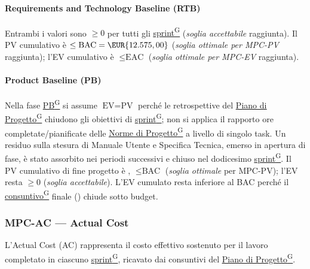 \documentclass[a4paper,12pt]{article}
\providecommand{\glslink}[2]{\href{https://alittlebyte-19.github.io/Documentazione/glossario.html\#gls-#1}{\underline{#2}\textsuperscript{\scriptsize G}}}
\begin{document}
\paragraph*{Requirements and Technology Baseline (RTB)} Entrambi i valori sono $\geq 0$ per tutti gli \glslink{sprint}{sprint} (\emph{soglia accettabile} raggiunta). Il PV cumulativo è $\leq \text{BAC} = \EUR{12.575,00}$ (\emph{soglia ottimale per MPC-PV} raggiunta); l'EV cumulativo è $\leq \text{EAC}$ (\emph{soglia ottimale per MPC-EV} raggiunta).

\paragraph*{Product Baseline (PB)} Nella fase \glslink{pb-product-baseline}{PB} si assume $\text{EV} = \text{PV}$ perché le retrospettive del \glslink{piano-di-progetto}{Piano di Progetto} chiudono gli obiettivi di \glslink{sprint}{sprint}; non si applica il rapporto ore completate/pianificate delle \glslink{norme-di-progetto}{Norme di Progetto} a livello di singolo task. Un residuo sulla stesura di Manuale Utente e Specifica Tecnica, emerso in apertura di fase, è stato assorbito nei periodi successivi e chiuso nel dodicesimo \glslink{sprint}{sprint}. Il PV cumulativo di fine progetto è , $\leq \text{BAC}$ (\emph{soglia ottimale} per MPC-PV); l'EV resta $\geq 0$ (\emph{soglia accettabile}). L'EV cumulato resta inferiore al BAC perché il \glslink{consuntivo}{consuntivo} finale () chiude sotto budget.

\subsubsection{MPC-AC — Actual Cost}

L'Actual Cost (AC) rappresenta il costo effettivo sostenuto per il lavoro completato in ciascuno \glslink{sprint}{sprint}, ricavato dai consuntivi del \glslink{piano-di-progetto}{Piano di Progetto}.
\end{document}
